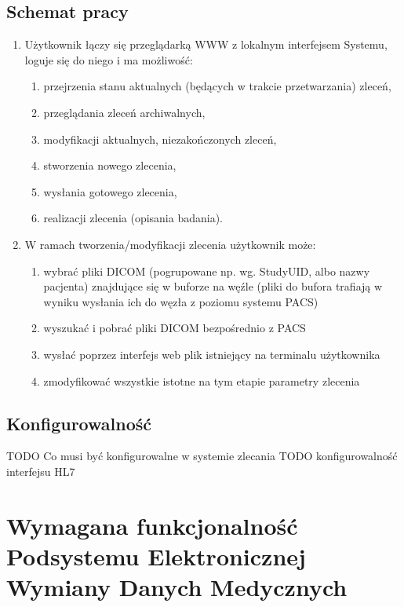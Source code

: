 \documentclass[a4paper]{report}
\begin{document}
\section{Schemat pracy}
\begin{enumerate}
\item Użytkownik łączy się przeglądarką WWW z lokalnym interfejsem Systemu, loguje się do niego i ma możliwość:
        \begin{enumerate}
        \item przejrzenia stanu aktualnych (będących w trakcie przetwarzania) zleceń,
        \item przeglądania zleceń archiwalnych,
        \item modyfikacji aktualnych, niezakończonych zleceń,
        \item stworzenia nowego zlecenia,
        \item wysłania gotowego zlecenia,
        \item realizacji zlecenia (opisania badania).
        \end{enumerate}
\item W ramach tworzenia/modyfikacji zlecenia użytkownik może:
        \begin{enumerate}
        \item wybrać pliki DICOM (pogrupowane np. wg. StudyUID, albo nazwy pacjenta) znajdujące się w buforze na węźle (pliki do bufora trafiają w wyniku wysłania ich do węzła z poziomu systemu PACS)
        \item wyszukać i pobrać pliki DICOM bezpośrednio z PACS
        \item wysłać poprzez interfejs web plik istniejący na terminalu użytkownika
        \item zmodyfikować wszystkie istotne na tym etapie parametry zlecenia
        \end{enumerate}
\end{enumerate}

\section{Konfigurowalność}

TODO Co musi być konfigurowalne w systemie zlecania 
TODO konfigurowalność interfejsu HL7

\chapter[Podsystem Elektronicznej Wymiany Danych Medycznych]{Wymagana funkcjonalność Podsystemu Elektronicznej Wymiany Danych Medycznych}
\end{document}
